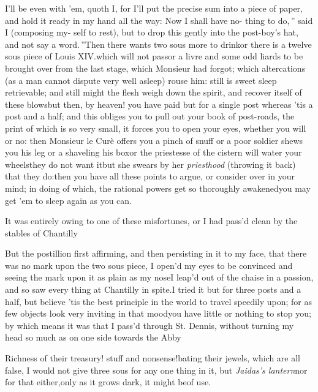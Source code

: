 \documentclass{article}
\begin{document}
\tsh I’ll be even with ’em, quoth I,\break
for I’ll put the precise sum into a piece\break
of paper, and hold it ready in my hand\break
all the way: \lqq Now I shall have no-\break
\lqq thing to do,\,” said I (composing my-\break
self to rest), \lqq but to drop this gently\break
\lqq into the post-boy’s hat, and not say\break
\lqq a word.\,”\tsh Then there wants two\break
sous more to drink\tsh or there is a
twelve sous piece of Louis XIV.\@ which will not pass\tsk or a livre and some odd liards
to be brought over from the last stage, which Monsieur had forgot; which
altercations (as a man cannot dispute very well asleep) rouse him: still is sweet
sleep retrievable; and still might the flesh weigh down the spirit, and recover
itself of these blows\tsk but then, by heaven!
you have paid but for a single post\break
\tsk whereas ’tis a post and a half; and this obliges you to pull out your book of
post-roads, the print of which is so very small, it forces you to open your eyes,
whether you will or no: then Monsieur le Curè offers you a pinch of snuff\tsh\break
or a poor soldier shews you his leg\tsh\break
or a shaveling his box\tsh or the priestesse of the
cistern will water your wheels\break\tsh they do not want it\tsh but she\break
swears by her \textit{priesthood} (throwing it back) that they do:\tsh then you have all these
points to argue, or consider over in your mind; in doing of which, the rational
powers get so thoroughly awakened\tsh you may get ’em to sleep again as you can.

It was entirely owing to one of these misfortunes, or I had
pass’d clean by the stables of
Chantilly\tsh

\tsh But the postillion first affirming, and then
persisting in it to my face, that there was no mark upon the two
sous piece, I open’d my eyes to be convinced\break
\tsk and seeing
the mark upon it as plain as my nose\tsk I leap’d out of
the chaise in a passion, and so saw every thing at Chantilly
in spite.\tsh I tried it but for three posts and a half,
but believe ’tis the best principle in the world to travel
speedily upon; for as few objects look very inviting in that
mood\tsk you have little or nothing to stop you; by which means
it was that I pass’d through St. Dennis, without turning my
head so much as on one side towards the Abby\tsh

\tsh Richness of their treasury! stuff and nonsense!\tsh bating their jewels, which are
all false, I would not give three sous for any one thing in it, but \textit{Jaidas’s
lantern}\tsh nor for that either,\break only as it grows dark, it might be\break of use.
\end{document}
